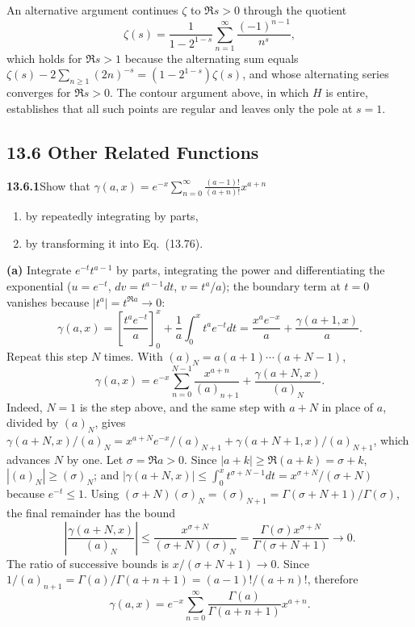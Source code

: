 An alternative argument continues $\zeta$ to $\Re s>0$ through
the quotient
\[
\zeta(s)=\frac1{1-2^{1-s}}\sum_{n=1}^{\infty}\frac{(-1)^{n-1}}{n^s},
\]
which holds for $\Re s>1$ because the alternating sum equals
$\zeta(s)-2\sum_{n\ge1}(2n)^{-s}=(1-2^{1-s})\zeta(s)$, and whose
alternating series converges for $\Re s>0$.
The contour argument above, in which $H$ is entire, establishes
that all such points are regular and leaves only the pole at
$s=1$.


\subsection*{13.6 Other Related Functions}

\par\bigskip
\noindent\textbf{13.6.1}\quad Show that
$\gamma(a,x)=e^{-x}\displaystyle\sum_{n=0}^{\infty}
\frac{(a-1)!}{(a+n)!}x^{a+n}$
\begin{enumerate}
\item[(a)] by repeatedly integrating by parts,
\item[(b)] by transforming it into Eq.~(13.76).
\end{enumerate}
\par\smallskip
{}
\solution
{}
\textbf{(a)} Integrate $e^{-t}t^{a-1}$ by parts, integrating
the power and differentiating the exponential ($u=e^{-t}$,
$dv=t^{a-1}dt$, $v=t^a/a$); the boundary term at $t=0$ vanishes
because $|t^a|=t^{\Re a}\to0$:
\[
\gamma(a,x)=\left[\frac{t^a e^{-t}}a\right]_0^x
+\frac1a\int_0^x t^ae^{-t}dt
=\frac{x^ae^{-x}}a+\frac{\gamma(a+1,x)}a.
\]
Repeat this step $N$ times.  With $(a)_N=a(a+1)\cdots(a+N-1)$,
\[
\gamma(a,x)=e^{-x}\sum_{n=0}^{N-1}\frac{x^{a+n}}{(a)_{n+1}}
+\frac{\gamma(a+N,x)}{(a)_N}.
\]
Indeed, $N=1$ is the step above, and the same step with $a+N$ in
place of $a$, divided by $(a)_N$, gives
$\gamma(a+N,x)/(a)_N=x^{a+N}e^{-x}/(a)_{N+1}
+\gamma(a+N+1,x)/(a)_{N+1}$, which advances $N$ by one.
Let $\sigma=\Re a>0$.  Since $|a+k|\ge\Re(a+k)=\sigma+k$,
$|(a)_N|\ge(\sigma)_N$; and
$|\gamma(a+N,x)|\le\int_0^xt^{\sigma+N-1}dt=x^{\sigma+N}/(\sigma+N)$
because $e^{-t}\le1$.  Using
$(\sigma+N)(\sigma)_N=(\sigma)_{N+1}=\Gamma(\sigma+N+1)/\Gamma(\sigma)$,
the final remainder has the bound
\[
\left|\frac{\gamma(a+N,x)}{(a)_N}\right|
\le\frac{x^{\sigma+N}}{(\sigma+N)(\sigma)_N}
=\frac{\Gamma(\sigma)x^{\sigma+N}}{\Gamma(\sigma+N+1)}
\longrightarrow0.
\]
The ratio of successive bounds is $x/(\sigma+N+1)\to0$.
Since $1/(a)_{n+1}=\Gamma(a)/\Gamma(a+n+1)=(a-1)!/(a+n)!$,
therefore
\[
\boxed{\gamma(a,x)=e^{-x}\sum_{n=0}^{\infty}
\frac{\Gamma(a)}{\Gamma(a+n+1)}x^{a+n}}.
\]

